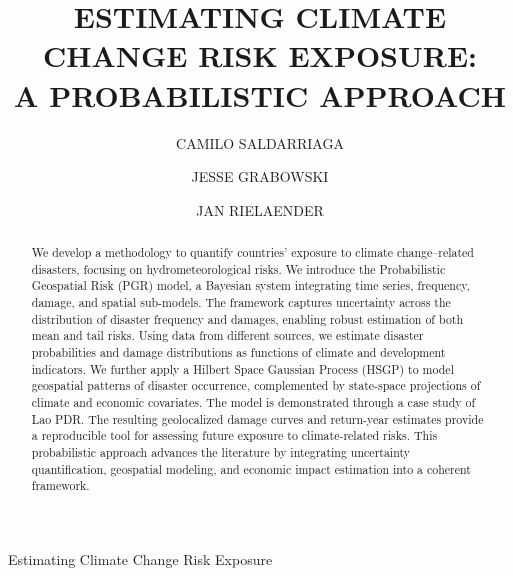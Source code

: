 \documentclass{ws-cce}
\begin{document}
         {Estimating Climate Change Risk Exposure}

\catchline{}{}{}{}{}

\title{ESTIMATING CLIMATE CHANGE RISK EXPOSURE:\\ A PROBABILISTIC APPROACH}

\author{CAMILO SALDARRIAGA}
\address{ESCP Business School\\
juan\_camilo.saldarriaga@edu.escp.eu}

\author{JESSE GRABOWSKI}
\address{Paris-1 Panth\'{e}on-Sorbonne\\
jessegrabowski@gmail.com}

\author{JAN RIELAENDER}
\address{OECD Development Center\\
Jan.RIELAENDER@oecd.org}

\maketitle

\begin{history}
\end{history}

\begin{abstract}
We develop a methodology to quantify countries' exposure to climate change--related disasters, focusing on hydrometeorological risks. We introduce the Probabilistic Geospatial Risk (PGR) model, a Bayesian system integrating time series, frequency, damage, and spatial sub-models. The framework captures uncertainty across the distribution of disaster frequency and damages, enabling robust estimation of both mean and tail risks. Using data from different sources, we estimate disaster probabilities and damage distributions as functions of climate and development indicators. We further apply a Hilbert Space Gaussian Process (HSGP) to model geospatial patterns of disaster occurrence, complemented by state-space projections of climate and economic covariates. The model is demonstrated through a case study of Lao PDR. The resulting geolocalized damage curves and return-year estimates provide a reproducible tool for assessing future exposure to climate-related risks. This probabilistic approach advances the literature by integrating uncertainty quantification, geospatial modeling, and economic impact estimation into a coherent framework.
\end{abstract}
\end{document}
